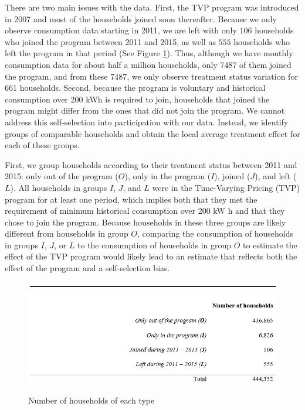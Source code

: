 \documentclass[12pt]{article}
\begin{document}
There are two main issues with the data. First, the TVP program was introduced in 2007 and most of the households joined soon thereafter. Because we only observe consumption data starting in 2011, we are left with only $106$ households who joined the program between 2011 and 2015, as well as $555$ households who left the program in that period (See Figure \ref{fig:table2}). Thus, although we have monthly consumption data for about half a million households, only 7487 of them joined the program, and from these 7487, we only observe treatment status variation for 661 households. Second, because the program is voluntary and historical consumption over 200 kWh is required to join, households that joined the program might differ from the ones that did not join the program. We cannot address this self-selection into participation with our data. Instead, we identify groups of comparable households and obtain the local average treatment effect for each of these groups.

First, we group households according to their treatment status between 2011 and 2015: only out of the program ($O$), only in the program ($I$), joined ($J$), and left ($L$). All households in groups $I$, $J$, and $L$ were in the Time-Varying Pricing (TVP) program for at least one period, which implies both that they met the requirement of minimum historical consumption over 200 kW h and that they chose to join the program. Because households in these three groups are likely different from households in group $O$, comparing the consumption of households in groups $I$, $J$, or $L$ to the consumption of households in group $O$ to estimate the effect of the TVP program would likely lead to an estimate that reflects both the effect of the program and a self-selection bias.

\begin{figure}[ht]
  \caption{Number of households of each type}\label{fig:table2}
  \begin{center}
  {\includegraphics[width=1\textwidth]{./figures/table2.png}}
  \end{center}
\end{figure}
\end{document}
